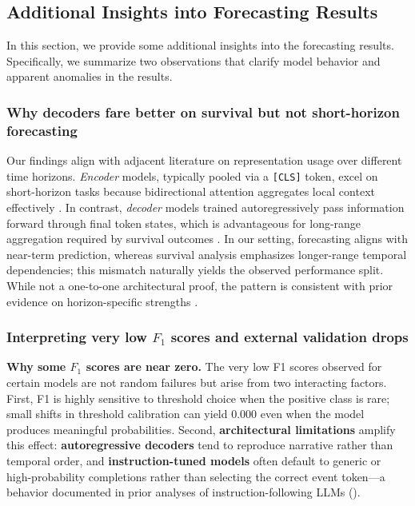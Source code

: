 \subsection{Additional Insights into Forecasting Results}
\label{ch07:apd:additional_insights}

In this section, we provide some additional insights into the forecasting results.
Specifically, we summarize two observations that clarify model behavior and apparent anomalies in the results.

\subsubsection{Why decoders fare better on survival but not short-horizon forecasting}
 Our findings align with adjacent literature on representation usage over different time horizons. \emph{Encoder} models, typically pooled via a \texttt{[CLS]} token, excel on short-horizon tasks because bidirectional attention aggregates local context effectively \citep{devlin2019bert,bai2018empirical}.
In contrast, \emph{decoder} models trained autoregressively pass information forward through final token states, which is advantageous for long-range aggregation required by survival outcomes \citep{dai2019style,zhou2021informer}.
In our setting, forecasting aligns with near-term prediction, whereas survival analysis emphasizes longer-range temporal dependencies; this mismatch naturally yields the observed performance split.
While not a one-to-one architectural proof, the pattern is consistent with prior evidence on horizon-specific strengths \citep{wang2025large}.

\subsubsection{Interpreting very low $F_{1}$ scores and external validation drops}
 \textbf{Why some $F_{1}$ scores are near zero.} The very low F1 scores observed for certain models are not random failures but arise from two interacting factors. First, F1 is highly sensitive to threshold choice when the positive class is rare; small shifts in threshold calibration can yield 0.000 even when the model produces meaningful probabilities. Second, \textbf{architectural limitations} amplify this effect: \textbf{autoregressive decoders} tend to reproduce narrative rather than temporal order, and \textbf{instruction-tuned models} often default to generic or high-probability completions rather than selecting the correct event token—a behavior documented in prior analyses of instruction-following LLMs (\cite{liu2024lost,wei2021finetuned}).

